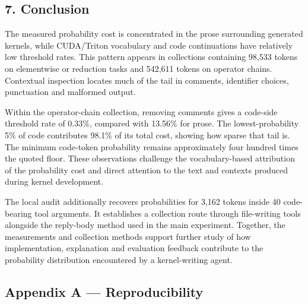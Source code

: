 \documentclass[
  11pt,
]{article}
\begin{document}
\hypertarget{conclusion}{%
\subsection{7. Conclusion}\label{conclusion}}

The measured probability cost is concentrated in the prose surrounding
generated kernels, while CUDA/Triton vocabulary and code continuations
have relatively low threshold rates. This pattern appears in collections
containing 98,533 tokens on elementwise or reduction tasks and 542,611
tokens on operator chains. Contextual inspection locates much of the
tail in comments, identifier choices, punctuation and malformed output.

Within the operator-chain collection, removing comments gives a
code-side threshold rate of 0.33\%, compared with 13.56\% for prose. The
lowest-probability 5\% of code contributes 98.1\% of its total cost,
showing how sparse that tail is. The minimum code-token probability
remains approximately four hundred times the quoted floor. These
observations challenge the vocabulary-based attribution of the
probability cost and direct attention to the text and contexts produced
during kernel development.

The local audit additionally recovers probabilities for 3,162 tokens
inside 40 code-bearing tool arguments. It establishes a collection route
through file-writing tools alongside the reply-body method used in the
main experiment. Together, the measurements and collection methods
support further study of how implementation, explanation and evaluation
feedback contribute to the probability distribution encountered by a
kernel-writing agent.

\hypertarget{appendix-a-reproducibility}{%
\subsection{Appendix A ---
Reproducibility}\label{appendix-a-reproducibility}}
\end{document}
